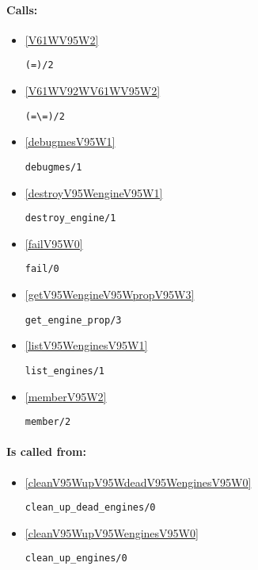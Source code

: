 \paragraph{Calls:} 
\begin{itemize}
\item \ref{V61WV95W2} 
\begin{verbatim}
(=)/2
\end{verbatim}

\item \ref{V61WV92WV61WV95W2} 
\begin{verbatim}
(=\=)/2
\end{verbatim}

\item \ref{debugmesV95W1} 
\begin{verbatim}
debugmes/1
\end{verbatim}

\item \ref{destroyV95WengineV95W1} 
\begin{verbatim}
destroy_engine/1
\end{verbatim}

\item \ref{failV95W0} 
\begin{verbatim}
fail/0
\end{verbatim}

\item \ref{getV95WengineV95WpropV95W3} 
\begin{verbatim}
get_engine_prop/3
\end{verbatim}

\item \ref{listV95WenginesV95W1} 
\begin{verbatim}
list_engines/1
\end{verbatim}

\item \ref{memberV95W2} 
\begin{verbatim}
member/2
\end{verbatim}

\end{itemize}
\paragraph{Is called from:} 
\begin{itemize}
\item \ref{cleanV95WupV95WdeadV95WenginesV95W0} 
\begin{verbatim}
clean_up_dead_engines/0
\end{verbatim}

\item \ref{cleanV95WupV95WenginesV95W0} 
\begin{verbatim}
clean_up_engines/0
\end{verbatim}

\end{itemize}

